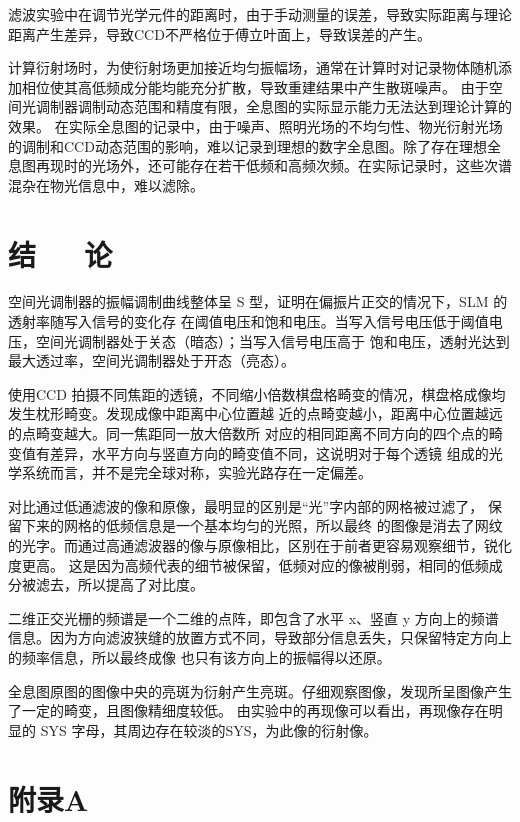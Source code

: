\documentclass[10pt,a4paper,twoside,UTF8]{ctexart}
\begin{document}
滤波实验中在调节光学元件的距离时，由于手动测量的误差，导致实际距离与理论距离产生差异，导致CCD不严格位于傅立叶面上，导致误差的产生。

计算衍射场时，为使衍射场更加接近均匀振幅场，通常在计算时对记录物体随机添加相位使其高低频成分能均能充分扩散，导致重建结果中产生散斑噪声。
由于空间光调制器调制动态范围和精度有限，全息图的实际显示能力无法达到理论计算的效果。
在实际全息图的记录中，由于噪声、照明光场的不均匀性、物光衍射光场的调制和CCD动态范围的影响，难以记录到理想的数字全息图。除了存在理想全息图再现时的光场外，还可能存在若干低频和高频次频。在实际记录时，这些次谱混杂在物光信息中，难以滤除。


\section{结~~~论}
空间光调制器的振幅调制曲线整体呈 S 型，证明在偏振片正交的情况下，SLM 的透射率随写入信号的变化存
在阈值电压和饱和电压。当写入信号电压低于阈值电压，空间光调制器处于关态（暗态）；当写入信号电压高于
饱和电压，透射光达到最大透过率，空间光调制器处于开态（亮态）。

使用CCD 拍摄不同焦距的透镜，不同缩小倍数棋盘格畸变的情况，棋盘格成像均发生枕形畸变。发现成像中距离中心位置越
近的点畸变越小，距离中心位置越远的点畸变越大。同一焦距同一放大倍数所
对应的相同距离不同方向的四个点的畸变值有差异，水平方向与竖直方向的畸变值不同，这说明对于每个透镜
组成的光学系统而言，并不是完全球对称，实验光路存在一定偏差。

对比通过低通滤波的像和原像，最明显的区别是“光”字内部的网格被过滤了，
保留下来的网格的低频信息是一个基本均匀的光照，所以最终
的图像是消去了网纹的光字。而通过高通滤波器的像与原像相比，区别在于前者更容易观察细节，锐化度更高。
这是因为高频代表的细节被保留，低频对应的像被削弱，相同的低频成分被滤去，所以提高了对比度。

二维正交光栅的频谱是一个二维的点阵，即包含了水平 x、竖直 y
方向上的频谱信息。因为方向滤波狭缝的放置方式不同，导致部分信息丢失，只保留特定方向上的频率信息，所以最终成像
也只有该方向上的振幅得以还原。

全息图原图的图像中央的亮斑为衍射产生亮斑。仔细观察图像，发现所呈图像产生了一定的畸变，且图像精细度较低。
由实验中的再现像可以看出，再现像存在明显的 SYS 字母，其周边存在较淡的SYS，为此像的衍射像。


\newpage
\printbibliography[title=参考文献] 
\clearpage

	 
\section*{\LARGE 附录A}
\end{document}
